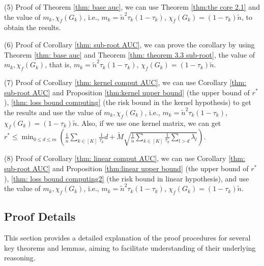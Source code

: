 \documentclass{article}
\begin{document}
(5) Proof of Theorem \ref{thm: base auc}, we can use Theorem \ref{thm:the core 2.1} and the value of $m_k, 
 \chi_f(G_k)$, i.e., $m_k = \tilde{n}^2 \tau_k(1-\tau_k)$, $\chi_f(G_k) = (1- \tau_k)\tilde{n}$, to obtain the results. 

(6) Proof of Corollary \ref{thm: sub-root AUC}, we can prove the corollary by using Theorem \ref{thm: base auc} and Theorem \ref{thm: theorem 3.3 sub-root}, the value of $m_k, \chi_f(G_k)$, that is, $m_k = \tilde{n}^2 \tau_k(1-\tau_k)$, $\chi_f(G_k) = (1- \tau_k)\tilde{n}$.

(7) Proof of Corollary \ref{thm: kernel comput AUC}, we can use Corollary \ref{thm: sub-root AUC} and Proposition \ref{thm:kernel upper bound} (the upper bound of $r^*$), \ref{thm: loss bound computing} (the risk bound in the kernel hypothesis) to get the results and use the value of $m_k, \chi_f(G_k)$, i.e., $m_k = \tilde{n}^2 \tau_k(1-\tau_k)$, $\chi_f(G_k) = (1- \tau_k)\tilde{n}$. Also, if we use one kernel matrix, we can get $r^* \leq \min _{0 \leq d \leq m} \left(\frac{1}{\tilde{n}} \sum_{k \in [K]} \frac{1}{\tau_k} d + \widetilde{M} \sqrt{\frac{1}{\tilde{n}} \sum_{k \in [K]} \frac{1}{ \tau_k} \sum _{l >d} \lambda_{l}} \right)$. 

(8) Proof of Corollary \ref{thm: linear comput AUC}, we can use Corollary \ref{thm: sub-root AUC} and Proposition \ref{thm:linear upper bound} (the upper bound of $r^*$), \ref{thm: loss bound computing2} (the risk bound in linear hypothesis), and use the value of $m_k, \chi_f(G_k)$, i.e., $m_k = \tilde{n}^2 \tau_k(1-\tau_k)$, $\chi_f(G_k) = (1- \tau_k)\tilde{n}$. 


\subsection{Proof Details} 
\label{section: B}
This section provides a detailed explanation of the proof procedures for several key theorems and lemmas, aiming to facilitate understanding of their underlying reasoning.
\end{document}
